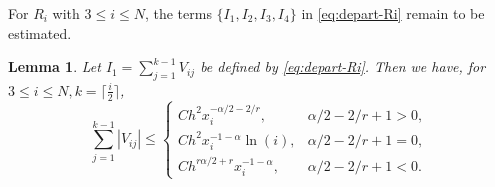 \documentclass{amsart}
\newtheorem{lemma}[theorem]{Lemma}
\theoremstyle{definition}
\theoremstyle{remark}
\numberwithin{equation}{section}
\begin{document}
For \(R_i\) with \(3\le i\le N\), the terms \(\{I_1, I_2, I_3, I_4\}\) in \eqref{eq:depart-Ri} remain to be estimated.
  \begin{lemma} \label{lmm:Ri-I1}
    Let \(I_1 = \sum_{j=1}^{k-1} V_{ij}\) be defined by \eqref{eq:depart-Ri}.
    Then we have, 
    for \(3\le i \le N, k=\lceil\frac{i}{2}\rceil\),
    \begin{equation*}
      \sum_{j=1}^{k-1} |V_{ij}| \le \begin{cases}
        C h^2 x_i^{-\alpha/2-2/r} ,        & \alpha/2-2/r+1 > 0, \\
        C h^2 x_i^{-1-\alpha} \ln(i),      & \alpha/2-2/r+1 = 0 ,\\
        C h^{r\alpha/2+r} x_i^{-1-\alpha}, & \alpha/2-2/r+1 < 0.
      \end{cases}
    \end{equation*}
  \end{lemma}
\end{document}
